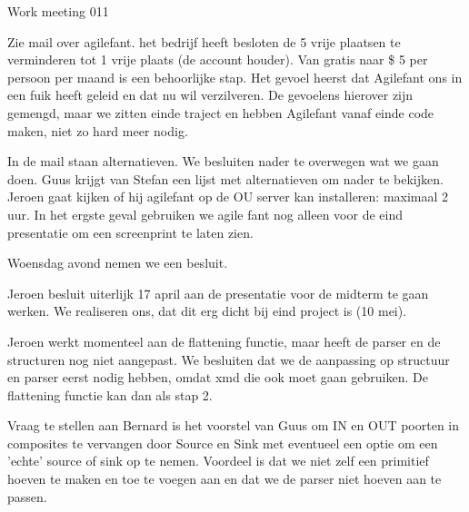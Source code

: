 \documentclass[a4paper,final]{article}
\begin{document}
\begin{Minutes}{Work meeting 011}
\subtitle{Update iteratie 5}

\maketitle%


Zie mail over agilefant. het bedrijf heeft besloten de 5 vrije plaatsen te verminderen tot 1 vrije plaats (de account houder).
Van gratis naar \$ 5 per persoon per maand is een behoorlijke stap. Het gevoel heerst dat Agilefant ons in een fuik heeft geleid 
en dat nu wil verzilveren. De gevoelens hierover zijn gemengd, maar we zitten einde traject en hebben Agilefant vanaf einde code 
maken, niet zo hard meer nodig.

In de mail staan alternatieven. We besluiten nader te overwegen wat we gaan doen. Guus krijgt van Stefan een lijst met alternatieven
om nader te bekijken. Jeroen gaat kijken of hij agilefant op de OU server kan installeren: maximaal 2 uur. In het ergste geval 
gebruiken we agile fant nog alleen voor de eind presentatie om een screenprint te laten zien.

Woensdag avond nemen we een besluit.


Jeroen besluit uiterlijk 17 april aan de presentatie voor de midterm te gaan werken. We realiseren ons,
dat dit erg dicht bij eind project is (10 mei).


Jeroen werkt momenteel aan de flattening functie, maar heeft de \json parser en de \xmas structuren
nog niet aangepast. We besluiten dat we de aanpassing op structuur en \json parser eerst nodig hebben,
omdat xmd die ook moet gaan gebruiken. De flattening functie kan dan als stap 2.

Vraag te stellen aan Bernard is het voorstel van Guus om IN en OUT poorten
in composites te vervangen door Source en Sink met eventueel een optie om een 
'echte' source of sink op te nemen. Voordeel is dat we niet zelf een primitief 
hoeven te maken en toe te voegen aan  en dat we de parser niet hoeven
aan te passen.


\end{Minutes}
\end{document}

